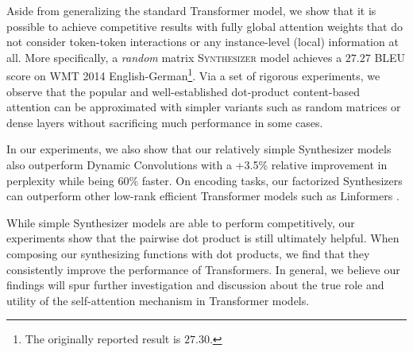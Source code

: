 \documentclass{article}
\begin{document}
Aside from generalizing the standard Transformer model, we show that it is possible to achieve competitive results with fully global attention weights that do not consider token-token interactions or any instance-level (local) information at all. More specifically, a \emph{random} matrix \textsc{Synthesizer} model achieves a $27.27$ BLEU score on WMT 2014 English-German\footnote{The originally reported result is $27.30$.}. Via a set of rigorous experiments, we observe that the popular and well-established dot-product content-based attention can be approximated with simpler variants such as random matrices or dense layers without sacrificing much performance in some cases. 

In our experiments, we also show that our relatively simple Synthesizer models also outperform Dynamic Convolutions \citep{wu2019pay} with a +3.5$\%$ relative improvement in perplexity while being $60\%$ faster. On encoding tasks, our factorized Synthesizers can outperform other low-rank efficient Transformer models such as Linformers \citep{wang2020linformer}.

While simple Synthesizer models are able to perform competitively, our experiments show that the pairwise dot product is still ultimately helpful. When composing our synthesizing functions with dot products, we find that they consistently improve the performance of Transformers. In general, we believe our findings will spur further investigation and discussion about the true role and utility of the self-attention mechanism in Transformer models.
\end{document}
